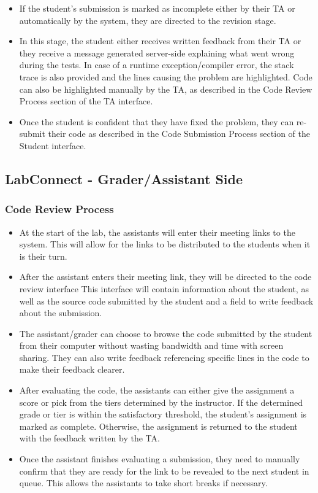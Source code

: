 \documentclass[a4paper, 12pt]{article}
\begin{document}
    \begin{itemize}
      \item If the student's submission is marked as incomplete either by their TA or automatically by the system, they are directed
      to the revision stage.
      \item In this stage, the student either receives written feedback from their TA or they receive a message generated server-side explaining
      what went wrong during the tests. In case of a runtime exception/compiler error, the stack trace is also provided and the lines causing the
      problem are highlighted. Code can also be highlighted manually by the TA, as described in the Code Review Process section of the TA interface.
      \item Once the student is confident that they have fixed the problem, they can re-submit their code as described in the Code Submission Process
      section of the Student interface.
    \end{itemize}

    \subsection{LabConnect - Grader/Assistant Side}

    \subsubsection{Code Review Process}

    \begin{itemize}
        \item At the start of the lab, the assistants will enter their meeting links to the system.
        This will allow for the links to be distributed to the students when it is their turn.
        \item After the assistant enters their meeting link, they will be directed to the code review interface
        This interface will contain information about the student, as well as the source code submitted by the student
        and a field to write feedback about the submission.
        \item The assistant/grader can choose to browse the code submitted by the student from their computer without wasting bandwidth
        and time with screen sharing. They can also write feedback referencing specific lines in the code to make their
        feedback clearer.
        \item After evaluating the code, the assistants can either give the assignment a score or pick
          from the tiers determined by the instructor. If the determined grade or tier is within the satisfactory
          threshold, the student's assignment is marked as complete. Otherwise, the assignment is returned to the
          student with the feedback written by the TA.
        \item Once the assistant finishes evaluating a submission, they need to manually confirm that they are
          ready for the link to be revealed to the next student in queue. This allows the assistants to take short
          breaks if necessary.
    \end{itemize}
\end{document}
